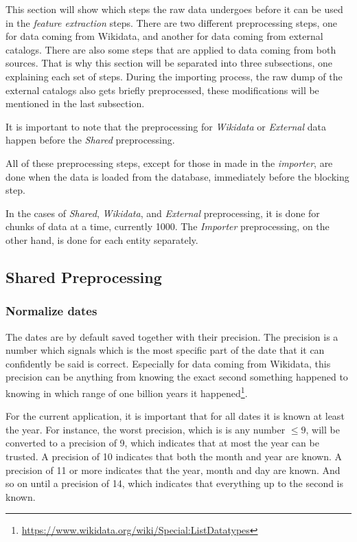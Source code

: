 \documentclass[epsfig,a4paper,11pt,titlepage,twoside,openany]{book}
\newcommand{\footurl}[1]{\footnote{\url{#1}}}
\begin{document}
This section will show which steps the raw data undergoes before it can be used in the \textit{feature extraction} steps. There are two different preprocessing steps, one for data coming from Wikidata, and another for data coming from external catalogs. There are also some steps that are applied to data coming from both sources. That is why this section will be separated into three subsections, one explaining each set of steps. During the importing process, the raw dump of the external catalogs also gets briefly preprocessed, these modifications will be mentioned in the last subsection.

It is important to note that the preprocessing for \textit{Wikidata} or \textit{External} data happen before the \textit{Shared} preprocessing. 

All of these preprocessing steps, except for those in made in the \textit{importer}, are done when the data is loaded from the database, immediately before the blocking step.

In the cases of \textit{Shared}, \textit{Wikidata}, and \textit{External} preprocessing, it is done for chunks of data at a time, currently 1000. The \textit{Importer} preprocessing, on the other hand, is done for each entity separately. 



\subsection{Shared Preprocessing}
\label{sec:data-preprocessing-shared}

\subsubsection{Normalize dates}
\label{sec:data-preprocessiong-date-normalization}


The dates are by default saved together with their precision. The precision is a number which signals which is the most specific part of the date that it can confidently be said is correct. Especially for data coming from Wikidata, this precision can be anything from knowing the exact second something happened to knowing in which range of one billion years it happened\footurl{https://www.wikidata.org/wiki/Special:ListDatatypes}.

For the current application, it is important that for all dates it is known at least the year. For instance, the worst precision, which is is any number $\leq 9$, will be converted to a precision of 9, which indicates that at most the year can be trusted. A precision of 10 indicates that both the month and year are known. A precision of 11 or more indicates that the year, month and day are known. And so on until a precision of 14, which indicates that everything up to the second is known. 
\end{document}
